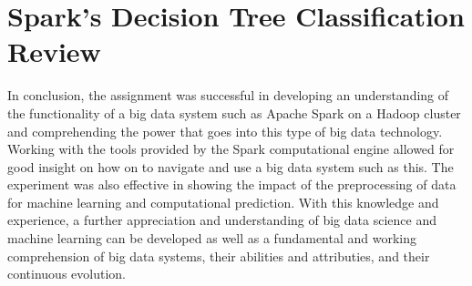 \documentclass[a4paper,12pt]{IEEEtran}
\begin{document}
\section{Spark's Decision Tree Classification Review}
In conclusion, the assignment was successful in developing an understanding of the functionality of a big data system such as Apache Spark on a Hadoop cluster and comprehending the power that goes into this type of big data technology. Working with the tools provided by the Spark computational engine allowed for good insight on how on to navigate and use a big data system such as this. The experiment was also effective in showing the impact of the preprocessing of data for machine learning and computational prediction. With this knowledge and experience, a further appreciation and understanding of big data science and machine learning can be developed as well as a fundamental and working comprehension of big data systems, their abilities and attributies, and their continuous evolution.
\end{document}
